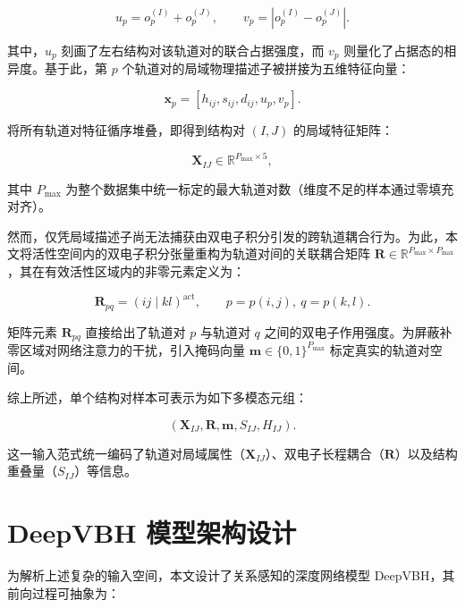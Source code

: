 \begin{equation}
u_p = o_p^{(I)} + o_p^{(J)},\qquad v_p = \left|o_p^{(I)} - o_p^{(J)}\right|.
\end{equation}

其中，$u_p$ 刻画了左右结构对该轨道对的联合占据强度，而 $v_p$ 则量化了占据态的相异度。基于此，第 $p$ 个轨道对的局域物理描述子被拼接为五维特征向量：

\begin{equation}
\mathbf{x}_p = [h_{ij}, s_{ij}, d_{ij}, u_p, v_p].
\end{equation}

将所有轨道对特征循序堆叠，即得到结构对 $(I,J)$ 的局域特征矩阵：

\begin{equation}
\mathbf{X}_{IJ} \in \mathbb{R}^{P_{\max} \times 5},
\end{equation}

其中 $P_{\max}$ 为整个数据集中统一标定的最大轨道对数（维度不足的样本通过零填充对齐）。

然而，仅凭局域描述子尚无法捕获由双电子积分引发的跨轨道耦合行为。为此，本文将活性空间内的双电子积分张量重构为轨道对间的关联耦合矩阵 $\mathbf{R} \in \mathbb{R}^{P_{\max} \times P_{\max}}$，其在有效活性区域内的非零元素定义为：

\begin{equation}
\mathbf{R}_{pq} = (ij \mid kl)^{\mathrm{act}},\qquad p = p(i,j),\ q = p(k,l).
\end{equation}

矩阵元素 $\mathbf{R}_{pq}$ 直接给出了轨道对 $p$ 与轨道对 $q$ 之间的双电子作用强度。为屏蔽补零区域对网络注意力的干扰，引入掩码向量 $\mathbf{m} \in \{0,1\}^{P_{\max}}$ 标定真实的轨道对空间。

综上所述，单个结构对样本可表示为如下多模态元组：

\begin{equation}
\left(\mathbf{X}_{IJ}, \mathbf{R}, \mathbf{m}, S_{IJ}, H_{IJ}\right).
\end{equation}

这一输入范式统一编码了轨道对局域属性（$\mathbf{X}_{IJ}$）、双电子长程耦合（$\mathbf{R}$）以及结构重叠量（$S_{IJ}$）等信息。

\section{DeepVBH 模型架构设计}

为解析上述复杂的输入空间，本文设计了关系感知的深度网络模型 DeepVBH，其前向过程可抽象为：

